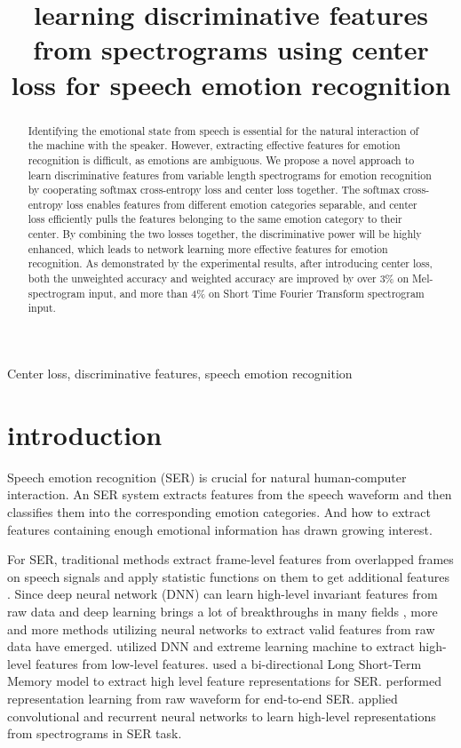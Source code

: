 \documentclass{article}
\title{learning discriminative features from spectrograms using center loss for speech emotion recognition}
\begin{document}
%
\maketitle
%
\begin{abstract}
Identifying the emotional state from speech is essential for the natural interaction of the machine with the speaker. However, extracting effective features for emotion recognition is difficult, as emotions are ambiguous. We propose a novel approach to learn discriminative features from variable length spectrograms for emotion recognition by cooperating softmax cross-entropy loss and center loss together. The softmax cross-entropy loss enables features from different emotion categories separable, and center loss efficiently pulls the features belonging to the same emotion category to their center. By combining the two losses together, the discriminative power will be highly enhanced, which leads to network learning more effective features for emotion recognition. As demonstrated by the experimental results, after introducing center loss, both the unweighted accuracy and weighted accuracy are improved by over 3\% on Mel-spectrogram input, and more than 4\% on Short Time Fourier Transform spectrogram input.
\end{abstract}
%
\begin{keywords}
Center loss, discriminative features, speech emotion recognition
\end{keywords}
%
\section{introduction}

Speech emotion recognition (SER) is crucial for natural human-computer interaction. An SER system extracts features from the speech waveform and then classifies them into the corresponding emotion categories. And how to extract features containing enough emotional information has drawn growing interest.

For SER, traditional methods extract frame-level features from overlapped frames on speech signals and apply statistic functions on them to get additional features \cite{el2011survey}. Since deep neural network (DNN) can learn high-level invariant features from raw data \cite{bengio2013representation} and deep learning brings a lot of breakthroughs in many fields \cite{lecun2015deep}, more and more methods utilizing neural networks to extract valid features from raw data have emerged. \cite{han2014speech} utilized DNN and extreme learning machine to extract high-level features from low-level features. \cite{lee2015high} used a bi-directional Long Short-Term Memory model to extract high level feature representations for SER. \cite{trigeorgis2016adieu} performed representation learning from raw waveform for end-to-end SER. \cite{satt2017efficient} applied convolutional and recurrent neural networks to learn high-level representations from spectrograms in SER task.
\end{document}
